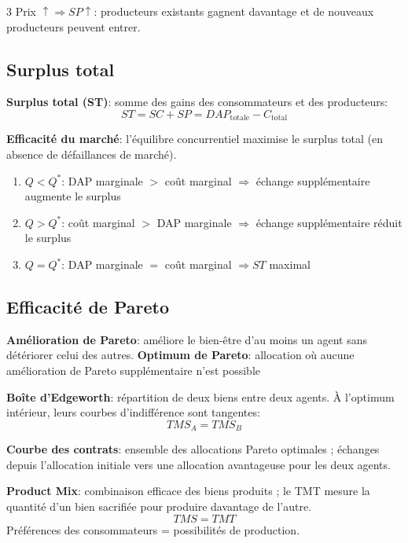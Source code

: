 \documentclass[12pt, a4paper]{article}
\begin{document}
\begin{multicols*}{3}
Prix $\uparrow\Rightarrow SP\uparrow$: producteurs existants gagnent davantage et de nouveaux producteurs peuvent entrer.

\subsection{Surplus total}

\textbf{Surplus total (ST)}: somme des gains des consommateurs et des producteurs:
\[
\boxed{ST=SC+SP=DAP_{\text{totale}}-C_{\text{total}}}
\]

\textbf{Efficacité du marché}: l'équilibre concurrentiel maximise le surplus total (en absence de défaillances de marché).
\begin{enumerate}[\roman*.]
  \item $Q<Q^*$: DAP marginale $>$ coût marginal $\Rightarrow$ échange supplémentaire augmente le surplus
  \item $Q>Q^*$: coût marginal $>$ DAP marginale $\Rightarrow$ échange supplémentaire réduit le surplus
  \item $Q=Q^*$: DAP marginale $=$ coût marginal $\Rightarrow ST$ maximal
\end{enumerate}

\colbreak
\subsection{Efficacité de Pareto}

\textbf{Amélioration de Pareto}: améliore le bien-être d'au moins un agent sans détériorer celui des autres.
\textbf{Optimum de Pareto}: allocation où aucune amélioration de Pareto supplémentaire n'est possible

\textbf{Boîte d'Edgeworth}: répartition de deux biens entre deux agents. À l'optimum intérieur, leurs courbes d'indifférence sont tangentes:
\[
\boxed{TMS_A=TMS_B}
\]
\begin{center}\vspace{-1em}
\end{center}\vspace{-1em}
\textbf{Courbe des contrats}: ensemble des allocations Pareto optimales ; échanges depuis l'allocation initiale vers une allocation avantageuse pour les deux agents.

\textbf{Product Mix}: combinaison efficace des biens produits ; le TMT mesure la quantité d'un bien sacrifiée pour produire davantage de l'autre.
\[
\boxed{TMS=TMT}
\]
Préférences des consommateurs = possibilités de production.


\end{multicols*}
\end{document}
